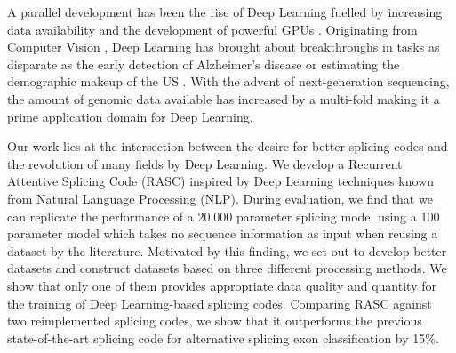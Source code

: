 A parallel development has been the rise of Deep Learning fuelled by increasing data availability and the development of powerful GPUs \cite{deeplearning}. 
Originating from Computer Vision \cite{alexnet}, Deep Learning has brought about breakthroughs in tasks as disparate as the early detection of Alzheimer's disease \cite{alzheimerdeeplearning} or estimating the demographic makeup of the US \cite{demographic}. 
With the advent of next-generation sequencing, the amount of genomic data available has increased by a multi-fold making it a prime application domain for Deep Learning. 



Our work lies at the intersection between the desire for better splicing codes and the revolution of many fields by Deep Learning. We develop a Recurrent Attentive Splicing Code (RASC) inspired by Deep Learning techniques known from Natural Language Processing (NLP). During evaluation, we find that we can replicate the performance of a 20,000 parameter splicing model using a 100 parameter model which takes no sequence information as input when reusing a dataset by the literature. Motivated by this finding, we set out to develop better datasets and construct datasets based on three different processing methods. We show that only one of them provides appropriate data quality and quantity for the training of Deep Learning-based splicing codes. Comparing RASC against two reimplemented splicing codes, we show that it outperforms the previous state-of-the-art splicing code for alternative splicing exon classification by 15\%. 




